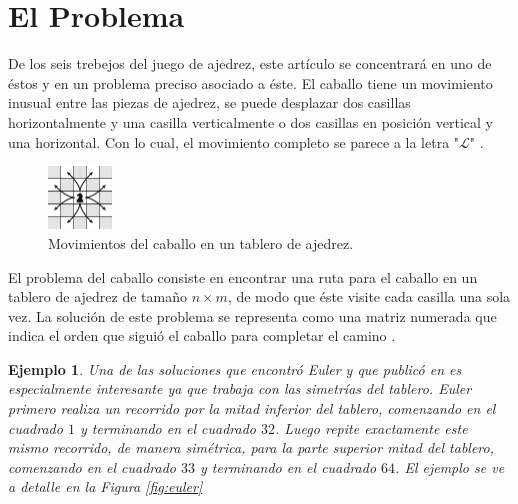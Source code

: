 \documentclass[journal, 10pt]{IEEEtran}
\newtheorem{example}{Ejemplo}
\begin{document}

\section{El Problema}
De los seis trebejos del juego de ajedrez, este art\'iculo se concentrará en uno de éstos y en un problema preciso asociado a éste. El caballo tiene un movimiento inusual entre las piezas de ajedrez, se puede desplazar dos casillas horizontalmente y una casilla verticalmente o dos casillas en posición vertical y una horizontal. Con lo cual, el movimiento completo se parece a la letra "$\mathcal{L}$"  \cite{Uehara:2019}.

\begin{figure}[h]

\centering
\includegraphics[width=0.15\textwidth]{figures/k_moves.png}
\caption{Movimientos del caballo en un tablero de ajedrez.}
\label{fig:moves}

\end{figure}

El problema del caballo consiste en encontrar una ruta para el caballo en un tablero de ajedrez de tamaño $n \times m$, de modo que éste visite cada casilla una sola vez. La soluci\'on de este problema se representa como una matriz numerada que indica el orden que sigui\'o el caballo para completar el camino \cite{Kopec:2016}.

\begin{example}
	Una de las soluciones que encontró Euler y que publicó en \cite{Euler:1759} es especialmente interesante ya que trabaja con las simetr\'ias del tablero. Euler primero realiza un recorrido por la mitad inferior del tablero, comenzando en el cuadrado $1$ y terminando en el cuadrado $32$. Luego repite exactamente este mismo recorrido, de manera sim\'etrica, para la parte superior mitad del tablero, comenzando en el cuadrado $33$ y terminando en el cuadrado $64$. El ejemplo se ve a detalle en la \textit{Figura \ref{fig:euler}} 
\end{example}
\end{document}

